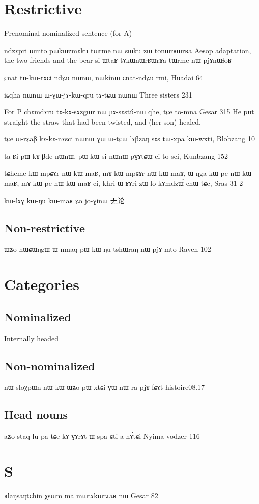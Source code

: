 \documentclass[oldfontcommands,oneside,a4paper,11pt]{memoir}
\begin{document}
\section{Restrictive}
Prenominal nominalized sentence (for A)

ndzɤpri ɯmto pɯkɯzmɤku tɯrme nɯ sɯku zɯ tonɯrʁɯrʁa
Aesop adaptation, the two friends and the bear
 si ɯtaʁ tɤkɯnɯrʁɯrʁa tɯrme nɯ pjɤnɯɬoʁ
 
 
 ɕnat	tu-kɯ-rɤɕi	ndʑu	nɯnɯ,	nɯkínɯ	ɕnat-ndʑu	rmi,
 Huadai 64
 
 iɕqha	nɯnɯ	ɯ-ɣɯ-jɤ-kɯ-qru	tɤ-tɕɯ	nɯnɯ
Three sisters 231

For P
chɤmdɤru	tɤ-kɤ-sɤzgɯr nɯ	ɲɤ-sɤstú-nɯ	qhe,	tɕe	to-mna
Gesar 	315
He put straight the straw that had been twisted, and (her son) healed.

tɕe ɯ-rʑaβ kɤ-kɤ-nɤsci nɯnɯ ɣɯ ɯ-tɕɯ lɤβzaŋ sɤs tɯ-xpa kɯ-wxti,
Blobzang 10

ta-ʁi	pɯ-kɤ-βde	nɯnɯ,	pɯ-kɯ-si	nɯnɯ	pɣɤtɕɯ	ci	to-sci,
Kunbzang 152

 tɕheme	kɯ-mpɕɤr	nɯ	kɯ-maʁ,	mɤ-kɯ-mpɕɤr	nɯ	kɯ-maʁ,	ɯ-ŋga	kɯ-pe	nɯ	kɯ-maʁ,	mɤ-kɯ-pe	nɯ	kɯ-maʁ	ci,	khri	ɯ-ʁɤri	zɯ	lo-kɤmdzɯ́-chɯ	tɕe,
Sras 31-2


kɯ-lɤɣ kɯ-ŋu kɯ-maʁ ʑo jo-ɣinɯ
无论
\subsection{Non-restrictive}
ɯʑo	nɯɕɯŋgɯ ɯ-nmaq		pɯ-kɯ-ŋu	tshɯraŋ	nɯ	pjɤ-mto
Raven 102

\section{Categories}
\subsection{Nominalized}
Internally headed
\subsection{Non-nominalized} \label{sub:relative.non.nmlz}
nɯ-sloχpɯn nɯ kɯ ɯʑo pɯ-xtɕi ɣɯ nɯ ra pjɤ-fɕɤt
histoire08.17

\subsection{Head nouns}
aʑo	staq-lu-pa	tɕe	kɤ-ɣɤrɤt	ɯ-spa	ɕti-a	nɤ́tɕi
Nyima vodzer 116

\section{S}
ʁlaŋsaŋtɕhin χsɯm ma mɯtɤkɯrʑaʁ nɯ
Gesar 82
\end{document}
